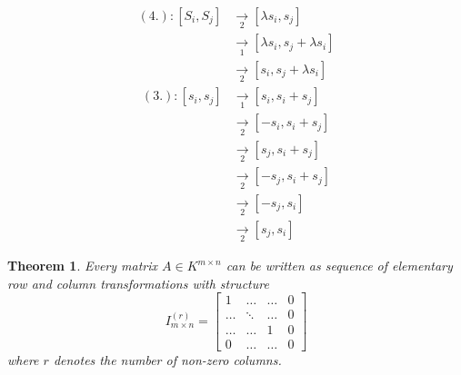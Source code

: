 \documentclass[a4paper,landscape,twocolumn]{article}
\newtheorem{theorem}{Theorem}
\begin{document}
\begin{align*}
  (4.):
    [S_i, S_j] &\underset{2}{\rightarrow} [\lambda s_i, s_j] \\
      &\underset{1}{\rightarrow} [\lambda s_i, s_j + \lambda s_i] \\
      &\underset{2}{\rightarrow} [s_i, s_j + \lambda s_i]
\end{align*}
\begin{align*}
  (3.): [s_i, s_j] &\underset{1}{\rightarrow} [s_i, s_i + s_j] \\
    &\underset{2}{\rightarrow} [-s_i, s_i + s_j] \\
    &\underset{2}{\rightarrow} [s_j, s_i + s_j] \\
    &\underset{2}{\rightarrow} [-s_j, s_i + s_j] \\
    &\underset{2}{\rightarrow} [-s_j, s_i] \\
    &\underset{2}{\rightarrow} [s_j, s_i]
\end{align*}
%
\begin{theorem}
  \label{satz-6.24}
  Every matrix $A \in K^{m\times n}$ can be written as sequence of elementary
  row and column transformations with structure
  \[
    I_{m \times n}^{(r)} =
    \begin{bmatrix}
      1 & \ldots & \ldots & 0 \\
      \ldots & \ddots & \ldots & 0 \\
      \ldots & \ldots & 1 & 0 \\
      0 & \ldots & \ldots & 0
    \end{bmatrix}
  \]
  where $r$ denotes the number of non-zero columns.
\end{theorem}
%
\end{document}
